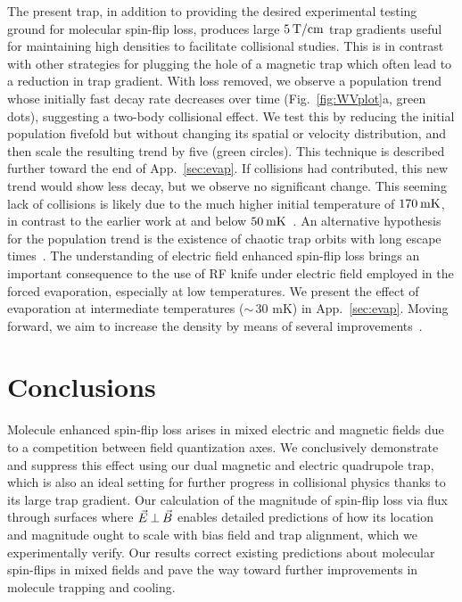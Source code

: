 \documentclass[%
 reprint,
 amsmath,amssymb,
 aps,
pra,
]{revtex4-1}
\newcommand{\epb}{{$\vec{E}\s {\perp}\s\vec{B}$}}
\newcommand{\s}{{\nobreak\hspace{.2em}}}
\begin{document}
The present trap, in addition to providing the desired experimental testing ground for molecular spin-flip loss, produces large $5\s\text{T/cm}$ trap gradients useful for maintaining high densities to facilitate collisional studies.
This is in contrast with other strategies for plugging the hole of a magnetic trap which often lead to a reduction in trap gradient.
With loss removed, we observe a population trend whose initially fast decay rate decreases over time (Fig.~\ref{fig:WVplot}a, green dots), suggesting a two-body collisional effect.
We test this by reducing the initial population fivefold but without changing its spatial or velocity distribution, and then scale the resulting trend by five (green circles).
This technique is described further toward the end of App.~\ref{sec:evap}.
If collisions had contributed, this new trend would show less decay, but we observe no significant change.
This seeming lack of collisions is likely due to the much higher initial temperature of $170\s\text{mK}$, in contrast to the earlier work at and below $50\s\text{mK}$~\cite{Stuhl2012evap}. An alternative hypothesis for the population trend is the existence of chaotic trap orbits with long escape times~\cite{Gonzalez-Ferez2014}.  The understanding of electric field enhanced spin-flip loss brings an important consequence to the use of RF knife under electric field employed in the forced evaporation, especially at low temperatures. We present the effect of evaporation at intermediate temperatures (${\sim}\,30\text{ mK}$) in App.~\ref{sec:evap}.  Moving forward, we aim to increase the density by means of several improvements~\cite{Even2015,Segev2017}.

\section{Conclusions}

Molecule enhanced spin-flip loss arises in mixed electric and magnetic fields due to a competition between field quantization axes.
We conclusively demonstrate and suppress this effect using our dual magnetic and electric quadrupole trap, which is also an ideal setting for further progress in collisional physics thanks to its large trap gradient.
Our calculation of the magnitude of spin-flip loss via flux through surfaces where \epb{} enables detailed predictions of how its location and magnitude ought to scale with bias field and trap alignment, which we experimentally verify.
Our results correct existing predictions about molecular spin-flips in mixed fields and pave the way toward further improvements in molecule trapping and cooling.
\end{document}

